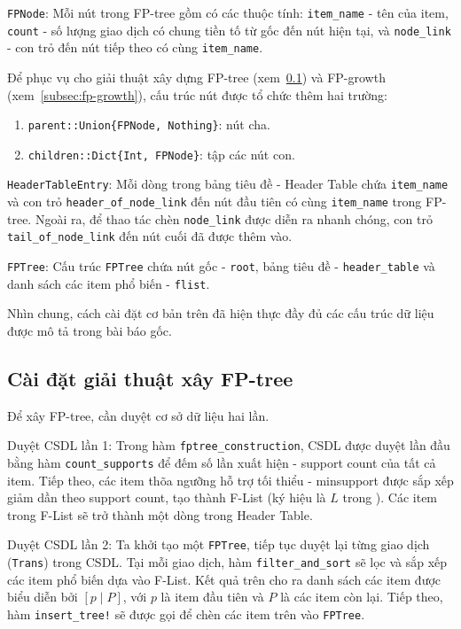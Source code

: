 \documentclass[conference]{IEEEtran}
\begin{document}
\texttt{FPNode}:
Mỗi nút trong FP-tree gồm có các thuộc tính: \texttt{item\_name} - tên của item, \texttt{count} - số lượng giao dịch có chung tiền tố từ gốc đến nút hiện tại, và \texttt{node\_link} - con trỏ đến nút tiếp theo có cùng \texttt{item\_name}.

Để phục vụ cho giải thuật xây dựng FP-tree (xem~\ref{subsec:fptree-construction}) và FP-growth (xem~\ref{subsec:fp-growth}), cấu trúc nút được tổ chức thêm hai trường:
\begin{enumerate}
    \item \texttt{parent::Union\{FPNode, Nothing\}}: nút cha.
    \item \texttt{children::Dict\{Int, FPNode\}}: tập các nút con.
\end{enumerate}

\texttt{HeaderTableEntry}:
Mỗi dòng trong bảng tiêu đề - Header Table chứa \texttt{item\_name} và con trỏ \texttt{header\_of\_node\_link} đến nút đầu tiên có cùng \texttt{item\_name} trong FP-tree. Ngoài ra, để thao tác chèn \texttt{node\_link} được diễn ra nhanh chóng, con trỏ \texttt{tail\_of\_node\_link} đến nút cuối đã được thêm vào.

\texttt{FPTree}:
Cấu trúc \texttt{FPTree} chứa nút gốc - \texttt{root}, bảng tiêu đề - \texttt{header\_table} và danh sách các item phổ biến - \texttt{flist}.

Nhìn chung, cách cài đặt cơ bản trên đã hiện thực đầy đủ các cấu trúc dữ liệu được mô tả trong bài báo gốc.

\subsection{Cài đặt giải thuật xây FP-tree}
\label{subsec:fptree-construction}
Để xây FP-tree, cần duyệt cơ sở dữ liệu hai lần.

Duyệt CSDL lần 1:
Trong hàm \texttt{fptree\_construction}, CSDL được duyệt lần đầu bằng hàm \texttt{count\_supports} để đếm số lần xuất hiện - support count của tất cả item. Tiếp theo, các item thõa ngưỡng hỗ trợ tối thiểu - minsupport được sắp xếp giảm dần theo support count, tạo thành F-List (ký hiệu là $L$ trong \cite{han2000mining}). Các item trong F-List sẽ trở thành một dòng trong Header Table.

Duyệt CSDL lần 2:
Ta khởi tạo một \texttt{FPTree}, tiếp tục duyệt lại từng giao dịch (\texttt{Trans}) trong CSDL. Tại mỗi giao dịch, hàm \texttt{filter\_and\_sort} sẽ lọc và sắp xếp các item phổ biến dựa vào F-List.
Kết quả trên cho ra danh sách các item được biểu diễn bởi $[p \mid P]$, với $p$ là item đầu tiên và $P$ là các item còn lại. Tiếp theo, hàm \texttt{insert\_tree!} sẽ được gọi để chèn các item trên vào \texttt{FPTree}.
\end{document}
